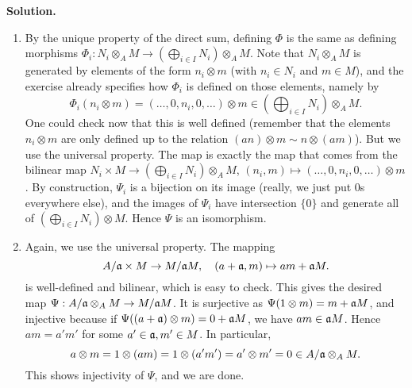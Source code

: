 \documentclass[a4paper,11pt]{article}
\begin{document}
\textbf{Solution.} 
\begin{enumerate}
    \item By the unique property of the direct sum, defining $\Phi$ is the same
        as defining morphisms $\Phi_i: N_i \otimes_A M \to \left( \bigoplus_{i \in I}
            N_i \right) \otimes_A M$. Note that $N_i \otimes_A M$ is generated
            by elements of the form $n_i \otimes m$ (with $n_i \in N_i$ and $m
            \in M$), and the exercise already specifies how $\Phi_i$ is defined
            on those elements, namely by
            \begin{equation*}
                \Phi_i( n_i \otimes m) = (\dots, 0, n_i, 0, \dots) \otimes m \in
                \left( \bigoplus_{i \in I} N_i \right ) \otimes_A M.
            \end{equation*}
            One could check now that this is well defined (remember that the
            elements $n_i \otimes m$ are only defined up to the relation
            $(an) \otimes m \sim n \otimes (am)$). 
            But we use the universal property. The map is exactly the map that
            comes from the bilinear map
            $N_i \times M \to \left(\bigoplus_{i \in I} N_i \right) \otimes_A M$,
            $(n_i, m) \mapsto ( \dots,0, n_i,0, \dots ) \otimes m$.
            By construction, $\Psi_i$ is a bijection on its image (really, we 
            just put $0$s everywhere else), and the images of $\Psi_i$ have
            intersection $\{0\}$ and generate all of $\left( \bigoplus_{i \in I}
                N_i \right) \otimes M$. 
            Hence $\Psi$ is an isomorphism.

        \item Again, we use the universal property. The mapping
            \begin{equation*}
                A/\mathfrak{a} \times M \to M / \mathfrak{a} M, \quad (a + \mathfrak{a}, m) \mapsto 
                am + \mathfrak{a} M.
            \end{equation*}
            is well-defined and bilinear, which is easy to check. This gives the
            desired map $\Psi: A/\mathfrak{a} \otimes_A M \to M/\mathfrak{a} M$. It is surjective 
            as $\Psi(1 \otimes m) = m + \mathfrak{a} M$, and injective because if 
            $\Psi((a + \mathfrak{a}) \otimes m) = 0 + \mathfrak{a} M$, we have $am \in \mathfrak{a} M$.
            Hence $am = a' m'$ for some $a' \in \mathfrak{a}, m' \in M$. In particular,
            $$a \otimes m = 1 \otimes (am) = 1 \otimes (a' m') = a' \otimes m' = 0
            \in A/\mathfrak{a} \otimes_A M.$$ 
            This shows injectivity of $\Psi$, and we are done.
\end{enumerate}
\end{document}
